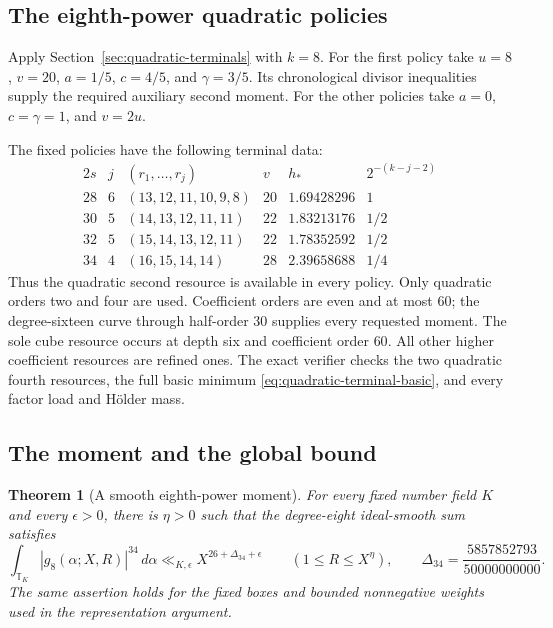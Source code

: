 \documentclass[11pt]{amsart}
\newtheorem{theorem}{Theorem}[section]
\theoremstyle{definition}
\numberwithin{equation}{section}
\begin{document}
\subsection{The eighth-power quadratic policies}
Apply Section~\ref{sec:quadratic-terminals} with $k=8$.
For the first policy take $u=8$, $v=20$, $a=1/5$, $c=4/5$,
and $\gamma=3/5$. Its chronological divisor inequalities
supply the required auxiliary second moment.
For the other policies take $a=0$, $c=\gamma=1$, and $v=2u$.

The fixed policies have the following terminal data:
\[
\begin{array}{c|c|c|c|c|c}
 2s&j&(r_1,\ldots,r_j)&v&h_*&2^{-(k-j-2)}\\\hline
28&6&(13,12,11,10,9,8)&20&1.69428296&1\\
30&5&(14,13,12,11,11)&22&1.83213176&1/2\\
32&5&(15,14,13,12,11)&22&1.78352592&1/2\\
34&4&(16,15,14,14)&28&2.39658688&1/4
\end{array}
\]
Thus the quadratic second resource is available in every policy.
Only quadratic orders two and four are used. Coefficient orders are even
and at most $60$; the degree-sixteen curve through half-order $30$ supplies
every requested moment. The sole cube resource occurs at depth six and
coefficient order $60$. All other higher coefficient resources are refined
ones. The exact verifier checks the two quadratic fourth resources,
the full basic minimum \eqref{eq:quadratic-terminal-basic}, and every factor
load and H\"older mass.

\subsection{The moment and the global bound}
\label{sec:eighth-global}
\begin{theorem}[A smooth eighth-power moment]
\label{thm:eighth-moment}
For every fixed number field $K$ and every $\epsilon>0$, there is
$\eta>0$ such that the degree-eight ideal-smooth sum satisfies
\[
 \int_{\mathbb T_K}|g_8(\alpha;X,R)|^{34}\,d\alpha
 \ll_{K,\epsilon}X^{26+\Delta_{34}+\epsilon}
 \qquad(1\le R\le X^\eta),
 \qquad
 \Delta_{34}=\frac{5857852793}{50000000000}.
\]
The same assertion holds for the fixed boxes and bounded nonnegative
weights used in the representation argument.
\end{theorem}
\end{document}
